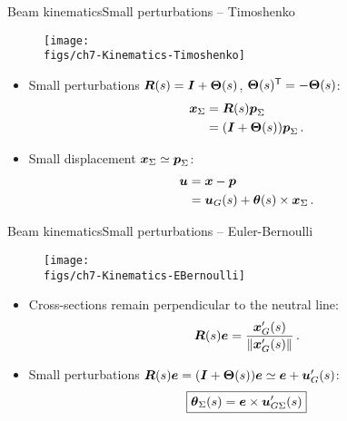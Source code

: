 \begin{frame}{Beam kinematics}{Small perturbations -- Timoshenko}

\vskip-10pt
\begin{figure}
\centering\texttt{[image: \\figs/ch7-Kinematics-Timoshenko]}
\end{figure}
\vskip-10pt
\begin{itemize}
\item Small perturbations ${\boldsymbol R}(s)={\boldsymbol I}+{\boldsymbol\Theta}(s)$, ${\boldsymbol\Theta}(s)^{\sf T}=-{\boldsymbol\Theta}(s)$:
\begin{displaymath}
\begin{split}
{\boldsymbol{x}}_\Sigma &= {\boldsymbol R}(s){\boldsymbol{p}}_\Sigma \\
&=({\boldsymbol I}+{\boldsymbol\Theta}(s)){\boldsymbol{p}}_\Sigma\,.
\end{split}
\end{displaymath}
\item Small displacement ${\boldsymbol{x}}_\Sigma\simeq{\boldsymbol{p}}_\Sigma$:
\begin{displaymath}
\begin{split}
{\boldsymbol{u}} &= {\boldsymbol{x}}-{\boldsymbol{p}} \\
&={\boldsymbol{u}}_G(s)+{\boldsymbol{\theta}}(s)\times{\boldsymbol{x}}_\Sigma\,.
\end{split}
\end{displaymath}
\end{itemize}

\end{frame}

\begin{frame}{Beam kinematics}{Small perturbations -- Euler-Bernoulli}

\vskip-10pt
\begin{figure}
\centering\texttt{[image: \\figs/ch7-Kinematics-EBernoulli]}
\end{figure}
\vskip-10pt
\begin{itemize}
\item Cross-sections remain perpendicular to the neutral line:
\begin{displaymath}
{\boldsymbol R}(s){\boldsymbol{e}}=\frac{{\boldsymbol{x}}_G'(s)}{\left\|{\boldsymbol{x}}_G'(s)\right\|}\,.
\end{displaymath}
\item Small perturbations ${\boldsymbol R}(s){\boldsymbol{e}}=({\boldsymbol I}+{\boldsymbol\Theta}(s)){\boldsymbol{e}}\simeq{\boldsymbol{e}}+{\boldsymbol{u}}_G'(s)$:
\begin{displaymath}
\boxed{{\boldsymbol{\theta}}_\Sigma(s)={\boldsymbol{e}}\times{\boldsymbol{u}}_{G\Sigma}'(s)}
\end{displaymath}
\end{itemize}

\end{frame}

